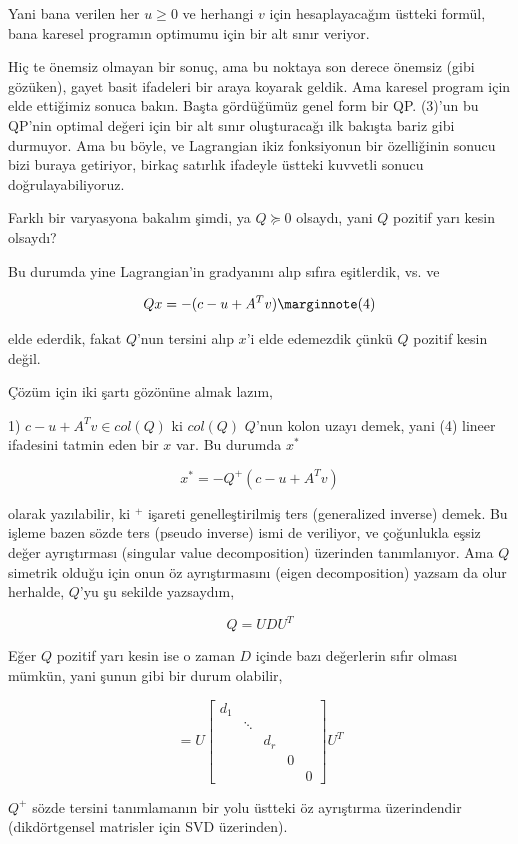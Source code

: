 \documentclass[12pt,fleqn]{article}\usepackage{../../common}
\begin{document}
Yani bana verilen her $u \ge 0$ ve herhangi $v$ için hesaplayacağım üstteki
formül, bana karesel programın optimumu için bir alt sınır veriyor.

Hiç te önemsiz olmayan bir sonuç, ama bu noktaya son derece önemsiz (gibi
gözüken), gayet basit ifadeleri bir araya koyarak geldik. Ama karesel
program için elde ettiğimiz sonuca bakın. Başta gördüğümüz genel form bir
QP. (3)'un bu QP'nin optimal değeri için bir alt sınır oluşturacağı ilk
bakışta bariz gibi durmuyor. Ama bu böyle, ve Lagrangian ikiz fonksiyonun
bir özelliğinin sonucu bizi buraya getiriyor, birkaç satırlık ifadeyle
üstteki kuvvetli sonucu doğrulayabiliyoruz.

Farklı bir varyasyona bakalım şimdi, ya $Q \succeq 0$ olsaydı, yani $Q$
pozitif yarı kesin olsaydı?

Bu durumda yine Lagrangian'in gradyanını alıp sıfıra eşitlerdik, vs. ve 

$$
Qx = -(c-u+A^Tv) 
\mlabel{4}
$$

elde ederdik, fakat $Q$'nun tersini alıp $x$'i elde edemezdik çünkü $Q$
pozitif kesin değil. 

Çözüm için iki şartı gözönüne almak lazım,

1) $c-u+A^T v \in col(Q)$ ki $col(Q)$ $Q$'nun kolon uzayı demek, yani (4)
lineer ifadesini tatmin eden bir $x$ var. Bu durumda $x^\ast$

$$
x^\ast = -Q^{+}(c-u+A^Tv)
$$

olarak yazılabilir, ki $^+$ işareti genelleştirilmiş ters (generalized
inverse) demek. Bu işleme bazen sözde ters (pseudo inverse) ismi de
veriliyor, ve çoğunlukla eşsiz değer ayrıştırması (singular value
decomposition) üzerinden tanımlanıyor. Ama $Q$ simetrik olduğu için onun öz
ayrıştırmasını (eigen decomposition) yazsam da olur herhalde, $Q$'yu şu
sekilde yazsaydım,

$$
Q = U D U^T
$$

Eğer $Q$ pozitif yarı kesin ise o zaman $D$ içinde bazı değerlerin sıfır
olması mümkün, yani şunun gibi bir durum olabilir, 

$$
= U \left[\begin{array}{ccccc}
d_1 & & & & \\
& \ddots & & & \\
& & d_r & & \\
& &  & 0 & \\
& &  &  & 0 
\end{array}\right]
U^T
$$

$Q^+$ sözde tersini tanımlamanın bir yolu üstteki öz ayrıştırma
üzerindendir (dikdörtgensel matrisler için SVD üzerinden). 
\end{document}
